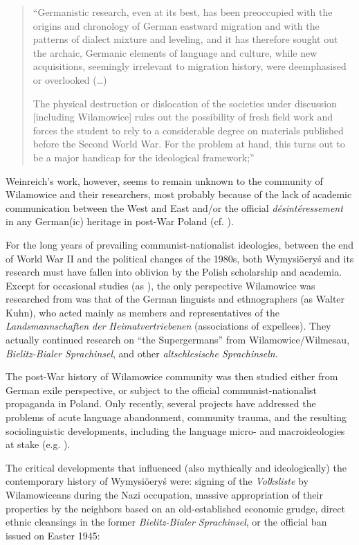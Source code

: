 \documentclass[output=paper]{langscibook}
\begin{document}
\begin{quote}
    “Germanistic research, even at its best, has been preoccupied with the origins and chronology of German eastward migration and with the patterns of dialect mixture and leveling, and it has therefore sought out the archaic, Germanic elements of language and culture, while new acquisitions, seemingly irrelevant to migration history, were deemphasised or overlooked (\ldots)
    
    The physical destruction or dislocation of the societies under discussion [including Wilamowice] rules out the possibility of fresh field work and forces the student to rely to a considerable degree on materials published before the Second World War. For the problem at hand, this turns out to be a major handicap for the ideological framework;”
\end{quote}

Weinreich's \citeyear{weinreich_yiddish_1958} work, however, seems to remain unknown to the community of Wilamowice and their researchers, most probably because of the lack of academic communication between the West and East and/or the official \textit{désintéressement} in any German(ic) heritage in post-War Poland (cf. \citealt{wicherkiewicz_impact_1993}).

For the long years of prevailing communist-nationalist ideologies, between the end of World War II and the political changes of the 1980s, both Wymysiöeryś and its research must have fallen into oblivion by the Polish scholarship and academia. Except for occasional studies (as \citealt{weinreich_yiddish_1958}), the only perspective Wilamowice was researched from was that of the German linguists and ethnographers (as Walter Kuhn), who acted mainly as members and representatives of the \textit{Landsmannschaften der Heimatvertriebenen} (associations of expellees). They actually continued research on “the Supergermans” from Wilamowice/Wilmesau, \textit{Bielitz-Bialer Sprachinsel}, and other \textit{altschlesische Sprachinseln}.

The post-War history of Wilamowice community was then studied either from German exile perspective, or subject to the official communist-nationalist propaganda in Poland. Only recently, several projects have addressed the problems of acute language abandonment, community trauma, and the resulting sociolinguistic developments, including the language micro- and macroideologies at stake (e.g. \citealt{chromik_mikro_2019}).

The critical developments that influenced (also mythically and ideologically) the contemporary history of Wymysiöeryś were: signing of the \textit{Volksliste} by Wilamowiceans during the Nazi occupation, massive appropriation of their properties by the neighbors based on an old-established economic grudge, direct ethnic cleansings in the former \textit{Bielitz-Bialer Sprachinsel}, or the official ban issued on Easter 1945: 
\end{document}
